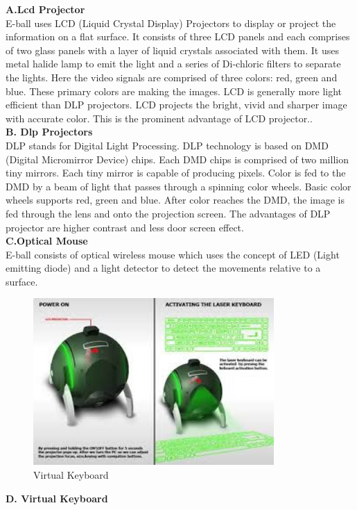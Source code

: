 \documentclass{article}
\begin{document}
 \textbf{A.Lcd Projector}\\
 E-ball uses LCD (Liquid Crystal Display) Projectors to display or project the information on a flat surface. It consists of three LCD panels and each comprises of two glass panels with a layer of liquid crystals associated with them. It uses metal halide lamp to emit the light and a series of Di-chloric filters to separate the lights. Here the video signals are comprised of three colors: red, green and blue. These primary colors are making the images. LCD is generally more light efficient than DLP projectors. LCD projects the bright, vivid and sharper image with accurate color. This is the prominent advantage of LCD projector..\\
 \textbf{B. Dlp Projectors}\\
  DLP stands for Digital Light Processing. DLP technology is based on DMD (Digital Micromirror Device) chips. Each DMD chips is comprised of two million tiny mirrors. Each tiny mirror is capable of producing pixels. Color is fed to the DMD by a beam of light that passes through a spinning color wheels. Basic color wheels supports red, green and blue. After color reaches the DMD, the image is fed through the lens and onto the projection screen. The advantages of DLP projector are higher contrast and less door screen effect.\\ 
 \textbf{C.Optical Mouse}\\
  E-ball consists of optical wireless mouse which uses the concept of LED (Light emitting diode) and a light detector to detect the movements relative to a surface.\\
  \newpage
  \begin{figure}[h]
\centering
\includegraphics[height=2.5in]{index5.jpg}
\caption[optional caption]{Virtual Keyboard}
\label{fig1: E-Ball model}
\end{figure}
  \textbf{ D. Virtual Keyboard}\\
\end{document}
